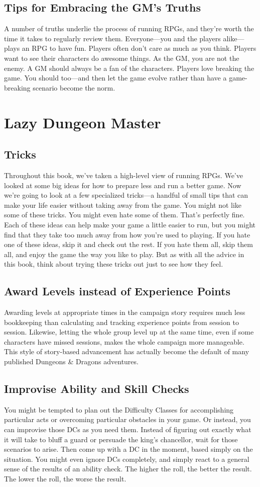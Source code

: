 \documentclass[10pt,a4paper,twoside,bg=print,twocolumn,openany,nodeprecatedcode]{dndbook}
\begin{document}
\subsection{Tips for Embracing the GM's Truths}
A number of truths underlie the process of running RPGs, and they're worth the time it takes to regularly review them.
Everyone—you and the players alike—plays an RPG to have fun.
Players often don't care as much as you think.
Players want to see their characters do awesome things.
As the GM, you are not the enemy. A GM should always be a fan of the characters.
Players love breaking the game. You should too—and then let the game evolve rather than have a game-breaking scenario become the norm.
\section{Lazy Dungeon Master}
\subsection{Tricks}
Throughout this book, we've taken a high-level view of running RPGs. We've looked at some big ideas for how to prepare less and run a better game. Now we're going to look at a few specialized tricks—a handful of small tips that can make your life easier without taking away from the game.
You might not like some of these tricks. You might even hate some of them. That's perfectly fine. Each of these ideas can help make your game a little easier to run, but you might find that they take too much away from how you're used to playing.
If you hate one of these ideas, skip it and check out the rest. If you hate them all, skip them all, and enjoy the game the way you like to play. But as with all the advice in this book, think about trying these tricks out just to see how they feel.
\subsection{Award Levels instead of Experience Points}
Awarding levels at appropriate times in the campaign story requires much less bookkeeping than calculating and tracking experience points from session to session. Likewise, letting the whole group level up at the same time, even if some characters have missed sessions, makes the whole campaign more manageable.
This style of story-based advancement has actually become the default of many published Dungeons \& Dragons adventures.
\subsection{Improvise Ability and Skill Checks}
You might be tempted to plan out the Difficulty Classes for accomplishing particular acts or overcoming particular obstacles in your game. Or instead, you can improvise those DCs as you need them. Instead of figuring out exactly what it will take to bluff a guard or persuade the king's chancellor, wait for those scenarios to arise. Then come up with a DC in the moment, based simply on the situation.
You might even ignore DCs completely, and simply react to a general sense of the results of an ability check. The higher the roll, the better the result. The lower the roll, the worse the result.
\end{document}
